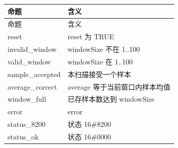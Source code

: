 \begin{longtable}{L{3.3cm}L{10.0cm}}

\toprule

命题 & 含义\\

\midrule

\endfirsthead

\toprule

命题 & 含义\\

\midrule

\endhead

{\ttfamily reset} & reset 为 TRUE\\

{\ttfamily invalid\_window} & windowSize 不在 1..100\\

{\ttfamily valid\_window} & windowSize 在 1..100\\

{\ttfamily sample\_accepted} & 本扫描接受一个样本\\

{\ttfamily average\_correct} & average 等于当前窗口内样本均值\\

{\ttfamily window\_full} & 已存样本数达到 windowSize\\

{\ttfamily error} & error\\

{\ttfamily status\_8200} & 状态 16\#8200\\

{\ttfamily status\_ok} & 状态 16\#0000\\

\bottomrule

\end{longtable}

